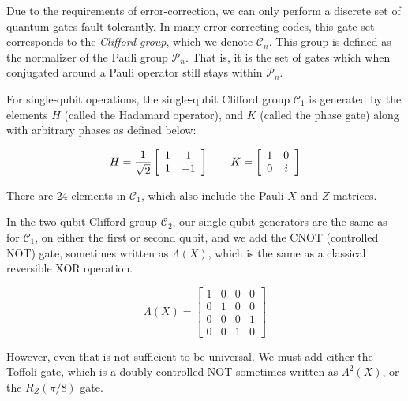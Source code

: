 Due to the requirements of error-correction, we can only perform a discrete
set of
quantum gates fault-tolerantly. In many error correcting codes, this gate
set corresponds to the \emph{Clifford group}, which we denote $\mathcal{C}_n$.
This group is defined as the
normalizer of the Pauli group $\mathcal{P}_n$.
That is, it is the set of gates which
when conjugated around a Pauli operator still stays within $\mathcal{P}_n$.

For single-qubit operations, the single-qubit Clifford group $\mathcal{C}_1$
is generated by the elements $H$ (called the Hadamard operator),
and $K$ (called the phase gate) along with arbitrary phases as defined below:

\begin{equation}
H = \frac{1}{\sqrt{2}}
 \left[
  \begin{array}{cc}
    1 & 1 \\
    1 & -1 \\
  \end{array} \right]
\qquad
K = 
 \left[
  \begin{array}{cc}
    1 & 0 \\
    0 & i \\
  \end{array} \right]
\end{equation}

There are 24 elements in $\mathcal{C}_1$, which also include the Pauli $X$ and
$Z$ matrices.

In the two-qubit Clifford group $\mathcal{C}_2$, our single-qubit
generators are the
same as for $\mathcal{C}_1$, on either the first or second qubit,
and we add the CNOT (controlled NOT) gate, sometimes written as $\Lambda(X)$, which
is the same as a classical reversible XOR operation.

\begin{equation}
\Lambda(X) = 
 \left[
  \begin{array}{cccc}
    1 & 0 & 0 & 0\\
    0 & 1 & 0 & 0\\
    0 & 0 & 0 & 1\\
    0 & 0 & 1 & 0
  \end{array} \right]
\end{equation}

However, even that is not sufficient to be universal. We must add either
the Toffoli gate, which is a doubly-controlled NOT sometimes written as
$\Lambda^2(X)$, or the $R_Z(\pi/8)$ gate.

